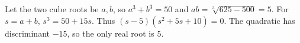 Let the two cube roots be $a,b$, so $a^3+b^3=50$ and $ab=\sqrt[3]{625-500}=5$. For $s=a+b$, $s^3=50+15s$. Thus $(s-5)(s^2+5s+10)=0$. The quadratic has discriminant $-15$, so the only real root is $\boxed5$.
